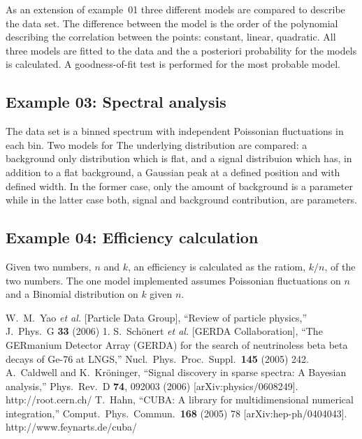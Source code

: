 \documentclass[11pt, a4paper]{article}
\begin{document}
As an extension of example~01 three different models are compared to
describe the data set. The difference between the model is the order
of the polynomial describing the correlation between the points:
constant, linear, quadratic. All three models are fitted to the data
and the a posteriori probability for the models is calculated. A
goodness-of-fit test is performed for the most probable model.


\subsection{Example 03: Spectral analysis} 
\label{section:example03} 

The data set is a binned spectrum with independent Poissonian
fluctuations in each bin. Two models for The underlying distribution
are compared: a background only distribution which is flat, and a
signal distribuion which has, in addition to a flat background, a
Gaussian peak at a defined position and with defined width. In the
former case, only the amount of background is a parameter while in the
latter case both, signal and background contribution, are parameters. 


\subsection{Example 04: Efficiency calculation} 

Given two numbers, $n$ and $k$, an efficiency is calculated as the
ratiom, $k/n$, of the two numbers. The one model implemented assumes
Poissonian fluctuations on $n$ and a Binomial distribution on $k$
given $n$. 



\begin{thebibliography}{99}
%
  W.~M.~Yao {\it et al.}  [Particle Data Group],
  ``Review of particle physics,''
  J.\ Phys.\ G {\bf 33} (2006) 1.
%
  S.~Sch{\"o}nert {\it et al.}  [GERDA Collaboration],
  ``The GERmanium Detector Array (GERDA) for the search of neutrinoless beta
  beta decays of Ge-76 at LNGS,''
  Nucl.\ Phys.\ Proc.\ Suppl.\  {\bf 145} (2005) 242.
%
  A.~Caldwell and K.~Kr{\"o}ninger,
  ``Signal discovery in sparse spectra: A Bayesian analysis,''
  Phys.\ Rev.\  D {\bf 74}, 092003 (2006)
  [arXiv:physics/0608249].
%
http://root.cern.ch/
%
  T.~Hahn, ``CUBA: A library for multidimensional numerical
  integration,'' Comput.\ Phys.\ Commun.\ {\bf 168} (2005) 78
  [arXiv:hep-ph/0404043].
%
  http://www.feynarts.de/cuba/
%
\end{thebibliography}
\end{document}
